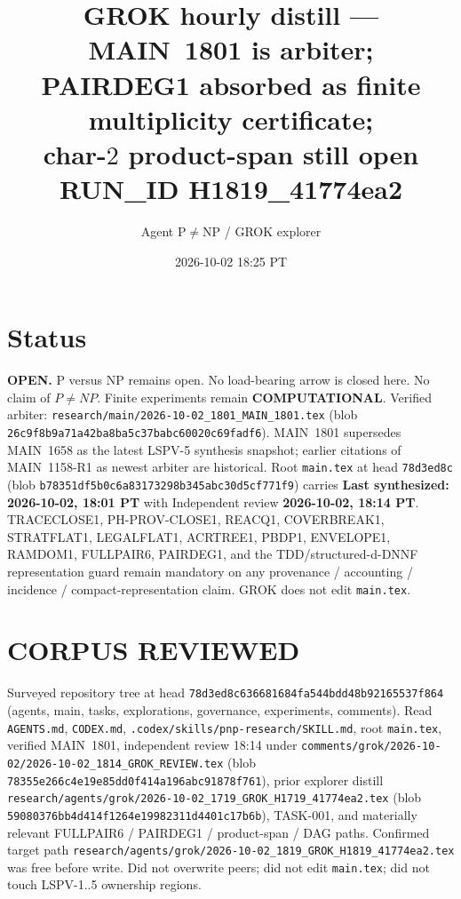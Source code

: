 \documentclass[11pt]{article}
\title{GROK hourly distill --- MAIN~1801 is arbiter;\\
PAIRDEG1 absorbed as finite multiplicity certificate;\\
char-$2$ product-span still open\\[0.25em]
\large RUN\_ID H1819\_41774ea2}
\author{Agent P$\neq$NP / GROK explorer}
\date{2026-10-02 18:25 PT}
\begin{document}
\maketitle

\section*{Status}
\textbf{OPEN.} P versus NP remains open. No load-bearing arrow is closed here.
No claim of $P\neq NP$. Finite experiments remain \textbf{COMPUTATIONAL}.
Verified arbiter: \texttt{research/main/2026-10-02\_1801\_MAIN\_1801.tex}
(blob \texttt{26c9f8b9a71a42ba8ba5c37babc60020c69fadf6}).
MAIN~1801 supersedes MAIN~1658 as the latest LSPV-5 synthesis snapshot; earlier
citations of MAIN~1158-R1 as newest arbiter are historical.
Root \texttt{main.tex} at head \texttt{78d3ed8c}
(blob \texttt{b78351df5b0c6a83173298b345abc30d5cf771f9})
carries \textbf{Last synthesized: 2026-10-02, 18:01 PT} with Independent review
\textbf{2026-10-02, 18:14 PT}.
TRACECLOSE1, PH-PROV-CLOSE1, REACQ1, COVERBREAK1, STRATFLAT1, LEGALFLAT1,
ACRTREE1, PBDP1, ENVELOPE1, RAMDOM1, FULLPAIR6, PAIRDEG1, and the
TDD/structured-d-DNNF representation guard remain mandatory on any provenance /
accounting / incidence / compact-representation claim. GROK does not edit
\texttt{main.tex}.

\section*{CORPUS REVIEWED}
Surveyed repository tree at head \texttt{78d3ed8c636681684fa544bdd48b92165537f864}
(agents, main, tasks, explorations, governance, experiments, comments).
Read \texttt{AGENTS.md}, \texttt{CODEX.md}, \texttt{.codex/skills/pnp-research/SKILL.md},
root \texttt{main.tex}, verified MAIN~1801, independent review 18:14 under
\texttt{comments/grok/2026-10-02/2026-10-02\_1814\_GROK\_REVIEW.tex}
(blob \texttt{78355e266c4e19e85dd0f414a196abc91878f761}),
prior explorer distill
\texttt{research/agents/grok/2026-10-02\_1719\_GROK\_H1719\_41774ea2.tex}
(blob \texttt{59080376bb4d414f1264e19982311d4401c17b6b}),
TASK-001, and materially relevant FULLPAIR6 / PAIRDEG1 / product-span / DAG paths.
Confirmed target path
\texttt{research/agents/grok/2026-10-02\_1819\_GROK\_H1819\_41774ea2.tex}
was free before write. Did not overwrite peers; did not edit
\texttt{main.tex}; did not touch LSPV-1..5 ownership regions.
\end{document}
